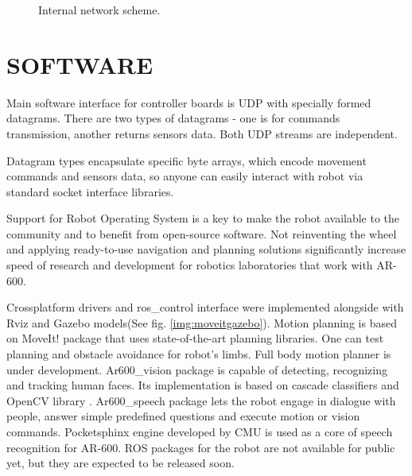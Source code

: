 \documentclass[letterpaper, 10 pt, conference]{ieeeconf}  %
\begin{document}
\begin{figure}[thpb]
\centering
{}
\caption{Internal network scheme.}
\label{img:network}
\end{figure}  

\section{SOFTWARE}

Main software interface for controller boards is UDP with specially formed
datagrams. There are two types of datagrams - one is for commands transmission,
another returns sensors data. Both UDP streams are independent.

Datagram types encapsulate specific byte arrays, which encode movement
commands and sensors data, so anyone can easily interact with robot via standard
socket interface libraries.

Support for Robot Operating System \cite{c2} is a key to make the robot
available to the community and to benefit from open-source software. Not
reinventing the wheel and applying ready-to-use navigation and planning
solutions significantly increase speed of research and development for robotics
laboratories that work with AR-600.

Crossplatform drivers and ros\_control interface were implemented alongside
with Rviz and Gazebo models(See fig. \ref{img:moveitgazebo}). Motion planning
is based on MoveIt! package \cite{c3} that uses state-of-the-art planning libraries. One can test planning
and obstacle avoidance for robot's limbs. Full body motion planner is under
development. Ar600\_vision package is capable of detecting, recognizing and
tracking human faces. Its implementation is based on cascade classifiers and
OpenCV library \cite{c4}. Ar600\_speech package lets the robot engage in
dialogue with people, answer simple predefined questions and execute motion or vision
commands. Pocketsphinx engine \cite{c5} developed by CMU is used as a core of
speech recognition for AR-600. ROS packages for the robot are not available for
public yet, but they are expected to be released soon.
\end{document}
